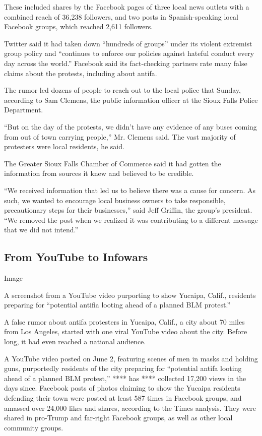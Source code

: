 These included shares by the Facebook pages of three local news outlets
with a combined reach of 36,238 followers, and two posts in
Spanish-speaking local Facebook groups, which reached 2,611 followers.

Twitter said it had taken down ``hundreds of groups'' under its violent
extremist group policy and ``continues to enforce our policies against
hateful conduct every day across the world.'' Facebook said its
fact-checking partners rate many false claims about the protests,
including about antifa.

The rumor led dozens of people to reach out to the local police that
Sunday, according to Sam Clemens, the public information officer at the
Sioux Falls Police Department.

``But on the day of the protests, we didn't have any evidence of any
buses coming from out of town carrying people,'' Mr. Clemens said. The
vast majority of protesters were local residents, he said.

The Greater Sioux Falls Chamber of Commerce said it had gotten the
information from sources it knew and believed to be credible.

``We received information that led us to believe there was a cause for
concern. As such, we wanted to encourage local business owners to take
responsible, precautionary steps for their businesses,'' said Jeff
Griffin, the group's president. ``We removed the post when we realized
it was contributing to a different message that we did not intend.''

\hypertarget{from-youtube-to-infowars}{%
\subsection{From YouTube to Infowars}\label{from-youtube-to-infowars}}

Image

A screenshot from a YouTube video purporting to show Yucaipa, Calif.,
residents preparing for ``potential antifia looting ahead of a planned
BLM protest.''

A false rumor about antifa protesters in Yucaipa, Calif., a city about
70 miles from Los Angeles, started with one viral YouTube video about
the city. Before long, it had even reached a national audience.

A YouTube video posted on June 2, featuring scenes of men in masks and
holding guns, purportedly residents of the city preparing for
``potential antifa looting ahead of a planned BLM protest,'' **** has
**** collected 17,200 views in the days since. Facebook posts of photos
claiming to show the Yucaipa residents defending their town were posted
at least 587 times in Facebook groups, and amassed over 24,000 likes and
shares, according to the Times analysis. They were shared in pro-Trump
and far-right Facebook groups, as well as other local community groups.

